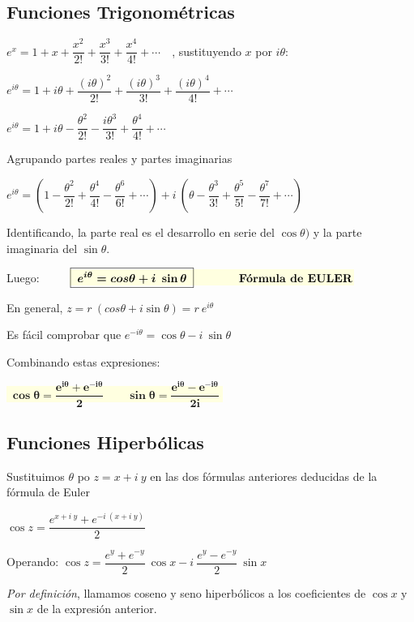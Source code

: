 \subsection{Funciones Trigonométricas}


$e^x=1+x+\displaystyle \dfrac {x^2}{2!}+\dfrac {x^3}{3!}+\dfrac {x^4}{4!}+ \cdots\quad$, sustituyendo $x$ por $i\theta$:


$e^{i\theta}=1+i\theta+ \dfrac {(i\theta)^2}{2!}+\dfrac {(i\theta)^3}{3!}+\dfrac {(i\theta)^4}{4!}+\cdots$

$e^{i\theta}=1+i\theta- \dfrac {\theta^2}{2!}-\dfrac {i\theta^3}{3!}+\dfrac {\theta^4}{4!}+\cdots $


Agrupando partes reales y partes imaginarias

$e^{i\theta}=
\left( 
1- \dfrac {\theta^2}{2!}+\dfrac {\theta^4}{4!}-\dfrac{\theta^6}{6!}+ \cdots
 \right) +
i\ \left( 
\theta-\dfrac {\theta^3}{3!}+\dfrac{\theta^5}{5!}-\dfrac{\theta^7}{7!}+\cdots
  \right) $

Identificando, la parte real es el desarrollo en serie del $\cos \theta)$ y la parte imaginaria del $\sin \theta$.

Luego: $\qquad$
\colorbox{LightYellow}{$\boxed{ \; \boldsymbol{ e^{i\theta}=cos \theta + i \ \sin \theta } \; } \qquad \qquad \text{\textbf{Fórmula de EULER}}$}

En general, $z=r\ (cos \theta + i \sin \theta) = r\ e^{i\theta}$

Es fácil comprobar que $e^{-i\theta}=\cos \theta - i\ \sin \theta$

Combinando estas expresiones:

\colorbox{LightYellow}{$\boxed{ \; \boldsymbol{ 
\cos \theta = \dfrac {e^{i\theta}+e^{-i\theta}}{2} \qquad \sin \theta=\dfrac{e^{i\theta}-e^{-i\theta}}{2i}
 } \; } $}

\subsection{Funciones Hiperbólicas}

Sustituimos $\theta$ po $z=x+i\ y$ en las dos fórmulas anteriores deducidas de la fórmula de Euler

$\cos z=\dfrac{e^{x+i\ y}+e^{-i\ (x+i\ y)}}{2}$

Operando: $\cos z=\dfrac{e^y+e^{-y}}{2} \ \cos x - i\ \dfrac{e^y-e^{-y}}{2} \ \sin x$ 

\emph{Por definición}, llamamos coseno y seno hiperbólicos a los coeficientes de $\cos x$ y $\sin x$ de la expresión anterior.

